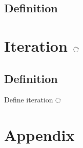 \documentclass[11pt]{article}
\def \loop {\ensuremath{\rotatebox[origin=c]{-90}{$\circlearrowright$}}}
\begin{document}
\subsection{Definition}

\section{Iteration \loop}
\subsection{Definition}
Define iteration \loop





\newpage
\section*{Appendix}
\end{document}
